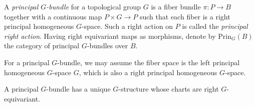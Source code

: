 \documentclass{../../large}
\begin{document}
\begin{prb}
A \emph{principal $G$-bundle} for a topological group $G$ is a fiber bundle $\pi:P\to B$ together with a continuous map $P\times G\to P$ such that each fiber is a right principal homogeneous $G$-space.
Such a right action on $P$ is called the \emph{principal right action}.
Having right equivariant maps as morphisms, denote by $\mathrm{Prin}_G(B)$ the category of principal $G$-bundles over $B$.

For a principal $G$-bundle, we may assume the fiber space is the left principal homogeneous $G$-space $G$, which is also a right principal homogeneous $G$-space.
\begin{parts}
\item A principal $G$-bundle has a unique $G$-structure whose charts are right $G$-equivariant.
\end{parts}
\end{prb}
\end{document}

